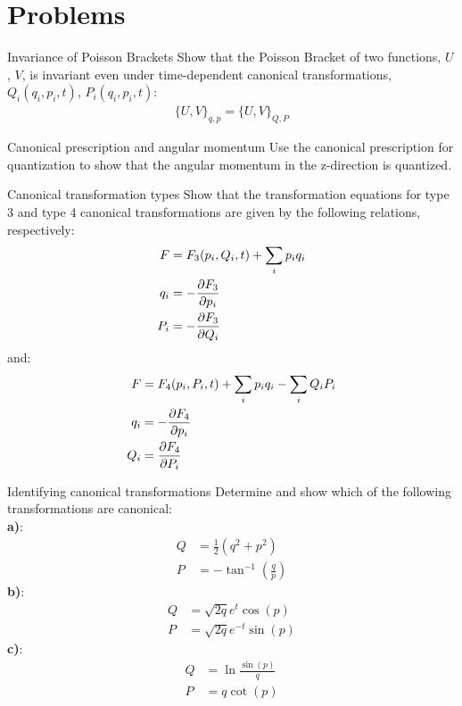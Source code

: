 \section{Problems}

\begin{problem}{Invariance of Poisson Brackets} Show that the Poisson Bracket of two functions, $U$, $V$, is invariant even under time-dependent canonical transformations, $Q_i(q_i,p_i,t)$, $P_i(q_i,p_i,t)$:
\begin{align*}
\{U,V\}_{q,p}=\{U,V\}_{Q,P}
\end{align*}
\label{prob_CT_1}
\end{problem}

\begin{problem}{Canonical prescription and angular momentum}
Use the canonical prescription for quantization to show that the angular momentum in the z-direction is quantized.
\label{prob_CT_2}
\end{problem}

\begin{problem}{Canonical transformation types}
Show that the transformation equations for type 3 and type 4 canonical transformations are given by the following relations, respectively:
\begin{align*}
F&=F_3(p_i,Q_i,t)+\sum_ip_iq_i \\
q_i&=-\frac{\partial F_3}{\partial p_i}\\
P_i&=-\frac{\partial F_3}{\partial Q_i}\\
\end{align*}
and:
\begin{align*}
F&=F_4(p_i,P_i,t)+\sum_ip_iq_i-\sum_iQ_iP_i\\
q_i&=-\frac{\partial F_4}{\partial p_i}\\
Q_i&=\frac{\partial F_4}{\partial P_i}\\
\end{align*}
\label{prob_CT_3}
\end{problem}

\begin{problem}{Identifying canonical transformations}
Determine and show which of the following transformations are canonical:\\
\textbf{a)}:
\begin{align*}
Q&=\frac{1}{2}(q^2+p^2)\\
P&=-\tan^{-1}(\frac{q}{p})
\end{align*}
\textbf{b)}:
\begin{align*}
Q&=\sqrt{2q}e^t \cos(p)\\
P&=\sqrt{2q}e^{-t}\sin(p)
\end{align*}
\textbf{c)}:
\begin{align*}
Q&=\ln\frac{\sin(p)}{q}\\
P&=q\cot(p)
\end{align*}
\label{prob_CT_4}
\end{problem}

